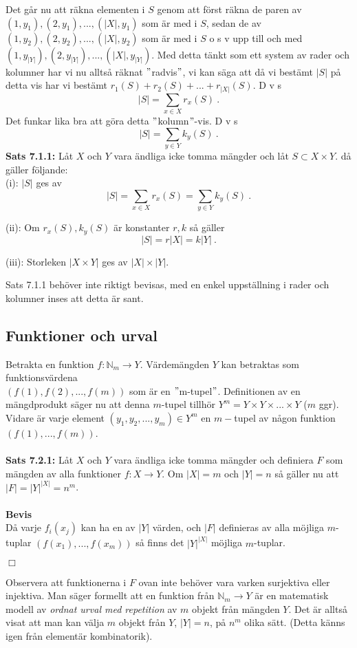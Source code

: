 \documentclass{article}
\begin{document}
Det går nu att räkna elementen i $S$ genom att först räkna de paren av $(1,y_1),(2,y_1),...,(|X|,y_1)$ som är med i $S$, sedan de av $(1,y_2),(2,y_2),...,(|X|,y_2)$ som är med i $S$ o s v upp till och med\\ $(1,y_{|Y|}),(2,y_{|Y|}),...,(|X|,y_{|Y|})$. Med detta tänkt som ett system av rader och kolumner har vi nu alltså räknat $"$radvis$"$, vi kan säga att då vi bestämt $|S|$ på detta vis har vi bestämt $r_1(S)+r_2(S)+...+r_{|X|}(S)$. D v s
$$
|S|=\sum_{x\in X}r_x(S) \ .
$$
Det funkar lika bra att göra detta $"$kolumn$"$-vis. D v s
$$
|S|=\sum_{y\in Y}k_y(S) \ .
$$
\textbf{Sats 7.1.1:} Låt $X$ och $Y$ vara ändliga icke tomma mängder och låt $S\subset X\times Y$. då gäller följande:\\

(i): $|S|$ ges av
$$
|S|=\sum_{x\in X}r_x(S)=\sum_{y\in Y}k_y(S) \ .
$$

(ii): Om $r_x(S),k_y(S)$ är konstanter $r,k$ så gäller
$$
|S|=r|X|=k|Y| \ .
$$

(iii): Storleken $|X\times Y|$ ges av $|X|\times|Y|$.

\noindent
Sats 7.1.1 behöver inte riktigt bevisas, med en enkel uppställning i rader och kolumner inses att detta är sant.
\subsection{Funktioner och urval}
Betrakta en funktion $f:\mathbb{N}_m\rightarrow Y$. Värdemängden $Y$ kan betraktas som funktionsvärdena\\ $(f(1),f(2),...,f(m))$ som är en $"$m-tupel$"$. Definitionen av en mängdprodukt säger nu att denna $m$-tupel tillhör $Y^m=Y\times Y\times...\times Y$ ($m$ ggr). Vidare är varje element $(y_1,y_2,...,y_m)\in Y^m$ en $m-$tupel av någon funktion $(f(1),...,f(m))$.\\ \\
\textbf{Sats 7.2.1:} Låt $X$ och $Y$ vara ändliga icke tomma mängder och definiera $F$ som mängden av alla funktioner $f:X\rightarrow Y$. Om $|X|=m$ och $|Y|=n$ så gäller nu att $|F|=|Y|^{|X|}=n^m$.\\ \\ 
\textbf{Bevis}\\
Då varje $f_i(x_j)$ kan ha en av $|Y|$ värden, och $|F|$ definieras av alla möjliga $m$-tuplar $(f(x_1),...,f(x_m))$ så finns det $|Y|^{|X|}$ möjliga $m$-tuplar.
\begin{flushright}
$\Box$
\end{flushright}
Observera att funktionerna i $F$ ovan inte behöver vara varken surjektiva eller injektiva. Man säger formellt att en funktion från $\mathbb{N}_m\rightarrow Y$ är en matematisk modell av \textit{ordnat urval med repetition} av $m$ objekt från mängden $Y$. Det är alltså visat att man kan välja $m$ objekt från $Y$, $|Y|=n$, på $n^m$ olika sätt. (Detta känns igen från elementär kombinatorik).
\end{document}
